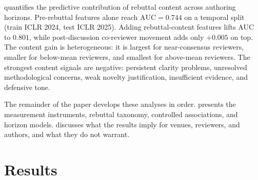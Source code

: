 \documentclass{article}
\newcommand{\auc}{\text{AUC}}
\begin{document}
\textbf{} quantifies the predictive contribution of rebuttal content across authoring horizons. Pre-rebuttal features alone reach $\auc = 0.744$ on a temporal split (train ICLR 2024, test ICLR 2025). Adding rebuttal-content features lifts $\auc$ to $0.801$, while post-discussion co-reviewer movement adds only $+0.005$ on top. The content gain is heterogeneous: it is largest for near-consensus reviewers, smaller for below-mean reviewers, and smallest for above-mean reviewers. The strongest content signals are negative: persistent clarity problems, unresolved methodological concerns, weak novelty justification, insufficient evidence, and defensive tone.

The remainder of the paper develops these analyses in order.  presents the measurement instruments, rebuttal taxonomy, controlled associations, and horizon models.  discusses what the results imply for venues, reviewers, and authors, and what they do not warrant.


\section{Results}\label{sec:results}
\end{document}
